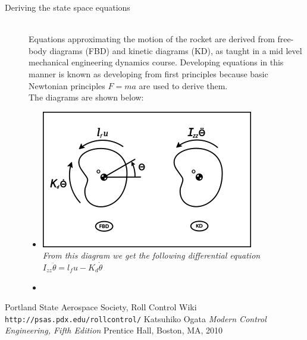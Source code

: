 \documentclass[12pt]{article}
\begin{document}
\begin{description}
		\item [Deriving the state space equations] \hfill \\
		Equations approximating the motion of the rocket are derived from free-body diagrams (FBD) and kinetic diagrams (KD), as taught in a mid level mechanical engineering dynamics course. Developing equations in this manner is known as developing from first principles because basic Newtonian principles $F=ma$ are used to derive them. \cite{PSAS} \\
		
		The diagrams are shown below:
		\begin{itemize}
			\item[] \includegraphics[scale=.5]{350x250-RollFBD.png} \\
			
				\textit{From this diagram we get the following differential equation}\\
				\textit{$I_{zz}\ddot{\theta} = l_{f}u - K_{d}\dot{\theta}$} \cite{PSAS} \\
			
			\item[]

				
		\end{itemize}
		
\end{description}
 
\newpage
 \begin{thebibliography}{9}
 Portland State Aerospace Society, Roll Control Wiki
 \texttt{http://psas.pdx.edu/rollcontrol/}
 Katsuhiko Ogata
 \textit{Modern Control Engineering, Fifth Edition}
 Prentice Hall, Boston, MA, 2010
 \end{thebibliography}
\end{document}
